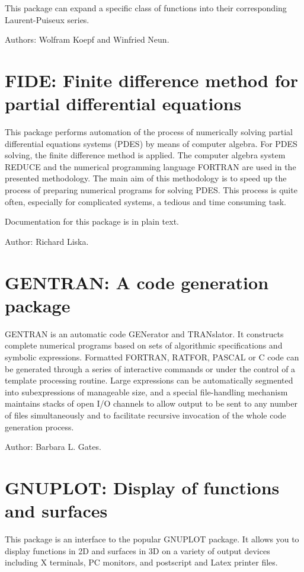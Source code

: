 This package can expand a specific class of functions into their
corresponding Laurent-Puiseux series.

Authors: Wolfram Koepf and Winfried Neun.

\section{FIDE: Finite difference method for partial differential equations}

This package performs  automation of  the process of numerically
solving  partial  differential  equations  systems  (PDES)  by  means of
computer algebra.  For PDES solving, the finite difference method is applied.
The  computer  algebra  system  REDUCE  and  the  numerical  programming
language FORTRAN  are used in the presented methodology. The main aim of
this methodology is to speed up the process of preparing numerical
programs for  solving PDES.  This process is quite often, especially for
complicated systems, a tedious and time consuming task.

Documentation for this package is in plain text.

Author: Richard Liska.

\section{GENTRAN: A code generation package} 

GENTRAN is an automatic code GENerator and TRANslator. It constructs
complete numerical programs based on sets of algorithmic specifications
and symbolic expressions. Formatted FORTRAN, RATFOR, PASCAL or C code can be
generated through a series of interactive commands or under the control of
a template processing routine. Large expressions can be automatically
segmented into subexpressions of manageable size, and a special
file-handling mechanism maintains stacks of open I/O channels to allow
output to be sent to any number of files simultaneously and to facilitate
recursive invocation of the whole code generation process.

Author: Barbara L. Gates.

\section{GNUPLOT: Display of functions and surfaces}

This package is an interface to the popular GNUPLOT package.
It allows you to display functions in 2D and surfaces in 3D
on a variety of output devices including X terminals, PC monitors, and
postscript and Latex printer files.

